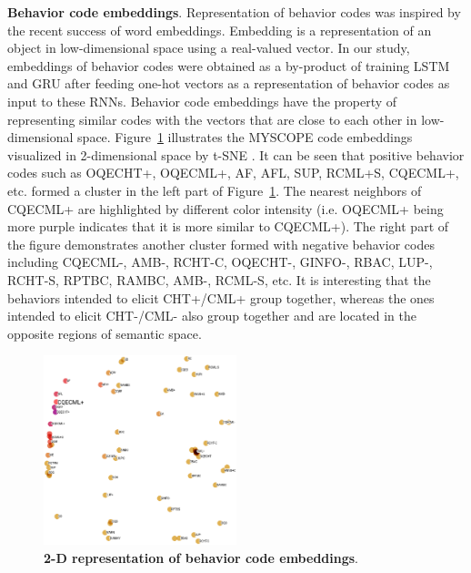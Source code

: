 \documentclass{amia_summit_2018}
\begin{document}
\textbf {Behavior code embeddings}. Representation of behavior codes was inspired by the recent success of word embeddings\cite{bengio2003neural}. Embedding is a representation of an object in low-dimensional space using a real-valued vector. In our study, embeddings of behavior codes were obtained as a by-product of training LSTM and GRU after feeding one-hot vectors as a representation of behavior codes as input to these RNNs. Behavior code embeddings have the property of representing similar codes with the vectors that are close to each other in low-dimensional space. Figure~\ref{fig:code_embedding} illustrates the MYSCOPE code embeddings visualized in 2-dimensional space by t-SNE \cite{maaten2008visualizing}. It can be seen that positive behavior codes such as OQECHT+, OQECML+, AF, AFL, SUP, RCML+S, CQECML+, etc. formed a cluster in the left part of Figure~\ref{fig:code_embedding}. The nearest neighbors of CQECML+ are highlighted by different color intensity (i.e. OQECML+ being more purple indicates that it is more similar to CQECML+). The right part of the figure demonstrates another cluster formed with negative behavior codes including CQECML-, AMB-, RCHT-C, OQECHT-, GINFO-, RBAC, LUP-, RCHT-S, RPTBC, RAMBC, AMB-, RCML-S, etc. It is interesting that the behaviors intended to elicit CHT+/CML+ group together, whereas the ones intended to elicit CHT-/CML- also group together and are located in the opposite regions of semantic space. 
    
\begin{figure}[!htb]
    \centering
    \includegraphics[width=0.50\textwidth]{figures/code_embed.eps}
    \caption{\textbf{2-D representation of behavior code embeddings}.}
    \label{fig:code_embedding}
\end{figure}
\end{document}
